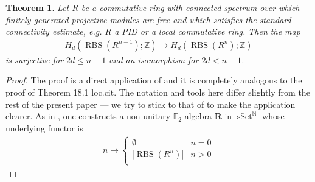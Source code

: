 \documentclass[12pt, reqno]{amsart}
\theoremstyle{plain}
\newtheorem{theorem}{Theorem}[section]
\theoremstyle{definition}
\newcommand{\N}{\mathbb N}
\newcommand{\Z}{\mathbb Z}
\begin{document}
\begin{theorem}\label{PID homological stability}
Let $R$ be a commutative ring with connected spectrum over which finitely generated projective modules are free and which satisfies the standard connectivity estimate, e.g. $R$ a PID or a local commutative ring. Then the map
\begin{align*}
H_d(\operatorname{RBS}(R^{n-1}); \Z)\longrightarrow H_d(\operatorname{RBS}(R^n); \Z)
\end{align*}
is surjective for $2d\leq n-1$ and an isomorphism for $2d< n-1$.
\end{theorem}
\begin{proof}
The proof is a direct application of \cite[Theorem 18.3]{GalatiusKupersRandalWilliams} and it is completely analogous to the proof of Theorem 18.1 loc.cit. The notation and tools here differ slightly from the rest of the present paper --- we try to stick to that of \cite{GalatiusKupersRandalWilliams} to make the application clearer. As in \cite[\S 17.1]{GalatiusKupersRandalWilliams}, one constructs a non-unitary $\mathbb{E}_2$-algebra $\mathbf{R}$ in $\operatorname{sSet}^\N$ whose underlying functor is
\begin{align*}
n\mapsto \begin{cases}
\emptyset & n=0 \\
|\operatorname{RBS}(R^n)| & n>0 \\
\end{cases}
\end{align*}


\end{proof}
\end{document}
